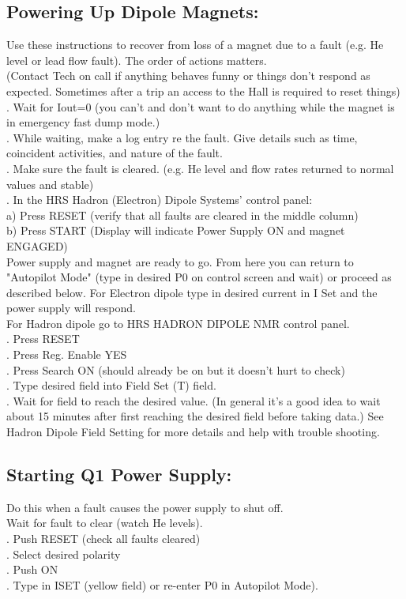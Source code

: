 \subsection{Powering Up Dipole Magnets:}
\noindent
Use these instructions to recover from loss of a magnet due to a fault (e.g. He level or lead flow fault). The order of actions matters. \\
(Contact Tech on call if anything behaves funny or things don't respond as expected. Sometimes after a trip an access to the Hall is required to reset things)\\
. Wait for Iout=0 (you can't and don't want to do anything while the magnet is in emergency fast dump mode.)\\
. While waiting, make a log entry re the fault. Give details such as time, coincident activities, and nature of the fault.\\
. Make sure the fault is cleared. (e.g. He level and flow rates returned to normal values and stable)\\
. In the HRS Hadron (Electron) Dipole Systems' control panel:\\
\noindent a) Press RESET (verify that all faults are cleared in the middle column)\\
\noindent b) Press START (Display will indicate Power Supply ON and magnet ENGAGED)\\
Power supply and magnet are ready to go. From here you can return
to "Autopilot Mode" 
(type in desired P0 on control screen and wait) or proceed as described below.
For Electron dipole type in desired current in I Set and the power supply will respond.\\ 
For Hadron dipole go to HRS HADRON DIPOLE NMR control panel.\\
. Press RESET\\
. Press Reg. Enable YES\\
. Press Search ON (should already be on but it doesn't hurt to check)\\
. Type desired field into Field Set (T) field.\\
. Wait for field to reach the desired value. (In general it's a good idea to wait about 15 minutes after first reaching
 the desired field before taking data.) See Hadron Dipole Field Setting for more details and help with trouble shooting.\\

\subsection{Starting Q1 Power Supply:}
\noindent Do this when a fault causes the power supply to shut off.\\
\noindent Wait for fault to clear (watch He levels). \\
. Push RESET (check all faults cleared)\\
. Select desired polarity\\
. Push ON\\
. Type in ISET (yellow field) or re-enter P0 in Autopilot Mode).\\

